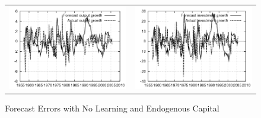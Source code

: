 \documentclass{beamer}
\begin{document}
\frame
{
\begin{figure}[ht]
\caption{Forecast Errors with No Learning and Endogenous Capital}
\begin{center}
\begin{tabular}{cc}
\includegraphics[scale=0.3]{plots/k_h_fe_y.png}  & \includegraphics[scale=0.3]{plots/k_h_fe_I.png}  \\

\end{tabular}
\end{center}
\end{figure}}
\end{document}
